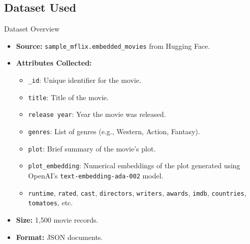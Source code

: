\documentclass{beamer}
\begin{document}
\subsection{Dataset Used}
\begin{frame}{Dataset Overview}
  \begin{itemize}
    \item \textbf{Source:} \texttt{sample\_mflix.embedded\_movies} from Hugging Face.
    \item \textbf{Attributes Collected:}
      \begin{itemize}
        \item \texttt{\_id}: Unique identifier for the movie.
        \item \texttt{title}: Title of the movie.
        \item \texttt{release year}: Year the movie was released.
        \item \texttt{genres}: List of genres (e.g., Western, Action, Fantasy).
        \item \texttt{plot}: Brief summary of the movie's plot.
        \item \texttt{plot\_embedding}: Numerical embeddings of the plot generated using OpenAI's \texttt{text-embedding-ada-002} model.
        \item \texttt{runtime}, \texttt{rated}, \texttt{cast}, \texttt{directors}, \texttt{writers}, \texttt{awards}, \texttt{imdb}, \texttt{countries}, \texttt{tomatoes}, etc.
      \end{itemize}
    \item \textbf{Size:} 1,500 movie records.
    \item \textbf{Format:} JSON documents.
  \end{itemize}
\end{frame}
\end{document}
